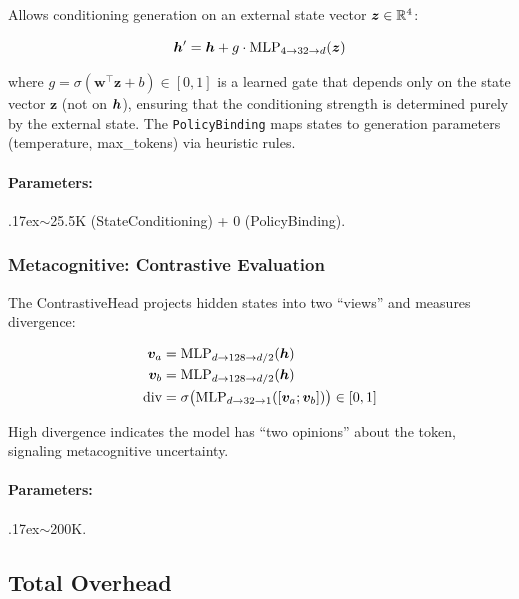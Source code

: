 Allows conditioning generation on an external state vector
$\bm{z} \in \mathbb{R}^4$:

\begin{equation}
    \bm{h}' = \bm{h} + g \cdot \text{MLP}_{4 \to 32 \to d}(\bm{z})
\end{equation}

where $g = \sigma(\bm{w}^\top \bm{z} + b) \in [0, 1]$ is a learned
gate that depends only on the state vector $\bm{z}$ (not on $\bm{h}$),
ensuring that the conditioning strength is determined purely by the
external state. The \texttt{PolicyBinding} maps states to generation
parameters (temperature, max\_tokens) via heuristic rules.

\paragraph{Parameters:} {\raise.17ex\hbox{$\scriptstyle\sim$}}25.5K (StateConditioning) + 0 (PolicyBinding).

\subsubsection{Metacognitive: Contrastive Evaluation}
\label{sec:metacognitive}

The ContrastiveHead projects hidden states into two ``views'' and
measures divergence:

\begin{align}
    \bm{v}_a &= \text{MLP}_{d \to 128 \to d/2}(\bm{h}) \\
    \bm{v}_b &= \text{MLP}_{d \to 128 \to d/2}(\bm{h}) \\
    \text{div} &= \sigma\big(\text{MLP}_{d \to 32 \to 1}([\bm{v}_a; \bm{v}_b])\big) \in [0, 1]
\end{align}

High divergence indicates the model has ``two opinions'' about the
token, signaling metacognitive uncertainty.

\paragraph{Parameters:} {\raise.17ex\hbox{$\scriptstyle\sim$}}200K.

\subsection{Total Overhead}

